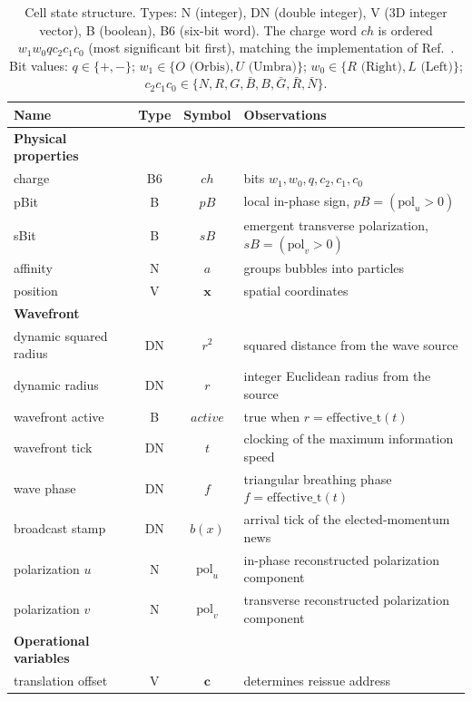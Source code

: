 \documentclass[a4paper]{article}
\renewcommand{\arraystretch}{1.5}
\begin{document}
\begin{table}[htbp]
\centering
\caption{Cell state structure. Types: N (integer), DN (double integer), V (3D integer vector), B (boolean), B6 (six-bit word). The charge word $ch$ is ordered $w_1 w_0 q c_2 c_1 c_0$ (most significant bit first), matching the implementation of Ref.~\cite{af_neto}. Bit values: $q \in \{+, -\}$; $w_1 \in \{O \text{ (Orbis)}, U \text{ (Umbra)}\}$; $w_0 \in \{R \text{ (Right)}, L \text{ (Left)}\}$; $c_2 c_1 c_0 \in \{N, R, G, \bar{B}, B, \bar{G}, \bar{R}, \bar{N}\}$.}
\label{tab:Cell-structure}
\renewcommand{\arraystretch}{1.2}
\begin{tabular}{|l|c|c|l|}
\hline
\textbf{Name} & \textbf{Type} & \textbf{Symbol} & \textbf{Observations} \\
\hline
\textbf{Physical properties} & & & \\
\hline
charge & B6 & $ch$ & bits $w_1, w_0, q, c_2, c_1, c_0$ \\
pBit & B & $pB$ & local in-phase sign, $pB = (\mathrm{pol}_u > 0)$ \\
sBit & B & $sB$ & emergent transverse polarization, $sB = (\mathrm{pol}_v > 0)$ \\
affinity & N & $a$ & groups bubbles into particles \\
position & V & $\boldsymbol{x}$ & spatial coordinates \\
\hline
\textbf{Wavefront} & & & \\
\hline
dynamic squared radius & DN & $r^2$ & squared distance from the wave source \\
dynamic radius & DN & $r$ & integer Euclidean radius from the source \\
wavefront active & B & $\mathit{active}$ & true when $r = \mathrm{effective\_t}(t)$ \\
wavefront tick & DN & $t$ & clocking of the maximum information speed \\
wave phase & DN & $f$ & triangular breathing phase $f = \mathrm{effective\_t}(t)$ \\
broadcast stamp & DN & $b(x)$ & arrival tick of the elected-momentum news \\
polarization $u$ & N & $\mathrm{pol}_u$ & in-phase reconstructed polarization component \\
polarization $v$ & N & $\mathrm{pol}_v$ & transverse reconstructed polarization component \\
\hline
\textbf{Operational variables} & & & \\
\hline
translation offset & V & $\mathbf{c}$ & determines reissue address \\

\end{tabular}
\end{table}
\end{document}
